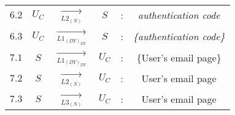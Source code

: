 \begin{center}
\begin{tabular}{ p{.25cm} c c c c c }
$6.2$ & $U_C$ & $\xrightarrow[L2_{(N)}]{}$ & $S$ & : & \textit{authentication code} \\ 

$6.3$ & $U_C$ & $\xrightarrow[L1_{(DY)_{DY}}]{}$ & $S$ & : & \textit{\{authentication code\}} \\ 


$7.1$ & $S$ & $\xrightarrow[L1_{(DY)_{DY}}]{}$ & $U_C$ & : & \{User's email page\} \\ 

$7.2$ & $S$ & $\xrightarrow[L2_{(N)}]{}$ & $U_C$ & : & User's email page \\ 

$7.3$ & $S$ & $\xrightarrow[L3_{(N)}]{}$ & $U_C$ & : & User's email page \\ 

\end{tabular} 
\end{center} 
